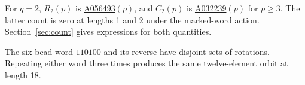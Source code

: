 \documentclass[11pt,letterpaper]{article}
\newcommand{\oeis}[1]{\href{https://oeis.org/A#1}{A#1}}
\begin{document}
For $q=2$, $R_2(p)$ is \oeis{056493}$(p)$, and $C_2(p)$ is \oeis{032239}$(p)$ for $p\ge3$. The latter count is zero at lengths 1 and 2 under the marked-word action. Section~\ref{sec:count} gives expressions for both quantities.
\begin{center}
\par
{\small The six-bead word $110100$ and its reverse have disjoint sets of rotations.\\
Repeating either word three times produces the same twelve-element orbit at length 18.}
\end{center}


\newpage
\end{document}
